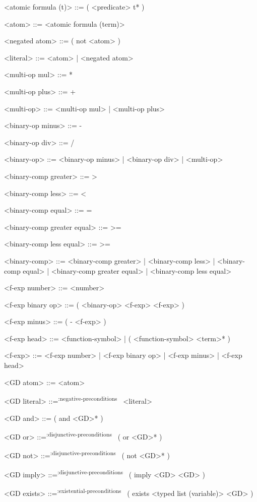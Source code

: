 \documentclass[]{article}
\newcommand{\negativepreconditions}{\textsuperscript{:negative-preconditions}~}
\newcommand{\disjunctivepreconditions}{\textsuperscript{:disjunctive-preconditions}~}
\newcommand{\existentialpreconditions}{\textsuperscript{:existential-preconditions}~}
\begin{document}
\begin{grammar}
    <atomic formula (t)> ::= ( <predicate> t* )

    <atom> ::= <atomic formula (term)>

    <negated atom> ::= ( not <atom> )

    <literal> ::= <atom> | <negated atom>


    <multi-op mul> ::= *

    <multi-op plus> ::= +

    <multi-op> ::= <multi-op mul> | <multi-op plus>

    <binary-op minus> ::= -

    <binary-op div> ::= /

    <binary-op> ::= <binary-op minus> | <binary-op div> | <multi-op>


    <binary-comp greater> ::= >

    <binary-comp less> ::= \textless

    <binary-comp equal> ::= =

    <binary-comp greater equal> ::= >=

    <binary-comp less equal> ::= \textgreater=

    <binary-comp> ::= <binary-comp greater> | <binary-comp less> \newline
        | <binary-comp equal> | <binary-comp greater equal> \newline
        | <binary-comp less equal>


    <f-exp number> ::= <number>

    <f-exp binary op> ::= ( <binary-op> <f-exp> <f-exp> )

    <f-exp minus> ::= ( - <f-exp> )

    <f-exp head> ::= <function-symbol> | ( <function-symbol> <term>* )

    <f-exp> ::= <f-exp number> | <f-exp binary op> | <f-exp minus> | <f-exp head>


    <GD atom> ::= <atom>

    <GD literal> ::=\negativepreconditions{} <literal>

    <GD and> ::=  ( and <GD>* )

    <GD or> ::=\disjunctivepreconditions{} ( or <GD>* )

    <GD not> ::=\disjunctivepreconditions{} ( not <GD>* )

    <GD imply> ::=\disjunctivepreconditions{} ( imply <GD> <GD> )

    <GD exists> ::=\existentialpreconditions{} ( exists <typed list (variable)> <GD> )


\end{grammar}
\end{document}
